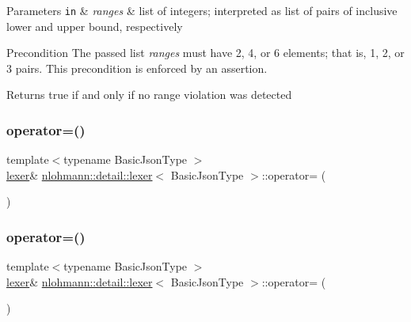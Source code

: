 \begin{DoxyParams}[1]{Parameters}
\mbox{\tt in}  & {\em ranges} & list of integers; interpreted as list of pairs of inclusive lower and upper bound, respectively\\
\hline
\end{DoxyParams}
\begin{DoxyPrecond}{Precondition}
The passed list {\itshape ranges} must have 2, 4, or 6 elements; that is, 1, 2, or 3 pairs. This precondition is enforced by an assertion.
\end{DoxyPrecond}
\begin{DoxyReturn}{Returns}
true if and only if no range violation was detected 
\end{DoxyReturn}
\mbox{\label{classnlohmann_1_1detail_1_1lexer_a33e97dee7c5faf1b36aff5b74a6c8f55}} 
\subsubsection{\texorpdfstring{operator=()}{operator=()}\hspace{0.1cm}{\footnotesize\ttfamily [1/2]}}
{\footnotesize\ttfamily template$<$typename Basic\+Json\+Type $>$ \\
\hyperlink{classnlohmann_1_1detail_1_1lexer}{lexer}\& \hyperlink{classnlohmann_1_1detail_1_1lexer}{nlohmann\+::detail\+::lexer}$<$ Basic\+Json\+Type $>$\+::operator= (\begin{DoxyParamCaption}\item[{\hyperlink{classnlohmann_1_1detail_1_1lexer}{lexer}$<$ Basic\+Json\+Type $>$ \&}]{ }\end{DoxyParamCaption})\hspace{0.3cm}{\ttfamily [delete]}}

\mbox{\label{classnlohmann_1_1detail_1_1lexer_af8ab91a774484fa220ba073421c8f452}} 
\subsubsection{\texorpdfstring{operator=()}{operator=()}\hspace{0.1cm}{\footnotesize\ttfamily [2/2]}}
{\footnotesize\ttfamily template$<$typename Basic\+Json\+Type $>$ \\
\hyperlink{classnlohmann_1_1detail_1_1lexer}{lexer}\& \hyperlink{classnlohmann_1_1detail_1_1lexer}{nlohmann\+::detail\+::lexer}$<$ Basic\+Json\+Type $>$\+::operator= (\begin{DoxyParamCaption}\item[{\hyperlink{classnlohmann_1_1detail_1_1lexer}{lexer}$<$ Basic\+Json\+Type $>$ \&\&}]{ }\end{DoxyParamCaption})\hspace{0.3cm}{\ttfamily [delete]}}

